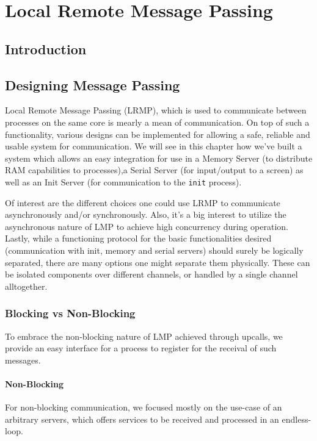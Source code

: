 \chapter{Local Remote Message Passing}
\section{Introduction}

\section{Designing Message Passing}
Local Remote Message Passing (LRMP), which is used to communicate between processes
on the same core is mearly a mean of communication. On top of such a functionality,
various designs can be implemented for allowing a safe, reliable and usable system
for communication. We will see in this chapter how we've built a system which allows
an easy integration for use in a Memory Server (to distribute RAM capabilities 
to processes),a Serial Server (for input/output to a screen) as well as an Init Server 
(for communication to the \texttt{init} process).

Of interest are the different choices one could use LRMP to communicate asynchronously and/or 
synchronously. Also, it's a big interest to utilize the asynchronous nature of LMP to
achieve high concurrency during operation. Lastly, while a functioning protocol for the basic
functionalities desired (communication with init, memory and serial servers) 
should surely be logically separated, there are many options one might separate them physically.
These can be isolated components over different channels, or handled by a single channel alltogether.

\subsection{Blocking vs Non-Blocking}
To embrace the non-blocking nature of LMP achieved through upcalls, we provide an 
easy interface for a process to register for the receival of such messages. 

\subsubsection{Non-Blocking}
For non-blocking communication, we focused mostly on the use-case of an arbitrary servers, 
which offers services to be received and processed in an endless-loop.

